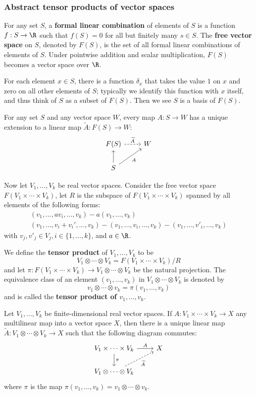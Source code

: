 \subsubsection{Abstract tensor products of vector spaces}
For any set $S$, a \textbf{formal linear combination} of elements of $S$ is a function $f:S\to\R$ such that $f(S)=0$ for all but finitely many $s\in S$. The \textbf{free vector space} on $S$, denoted by $F(S)$, is the set of all formal linear combinations of elements of $S$. Under pointwise addition and scalar multiplication, $F(S)$ becomes a vector space over $\R$.\par
For each element $x\in S$, there is a function $\delta_x$ that takes the value $1$
on $x$ and zero on all other elements of $S$; typically we identify this function with $x$ itself, and thus think of $S$ as a subset of $F(S)$. Then we see $S$ is a basis of $F(S)$.
\begin{proposition}
For any set $S$ and any vector space $W$, every map $A:S\to W$ has a unique extension to a linear map $\widetilde{A}:F(S)\to W$:
\[\begin{tikzcd}
F(S)\ar[r,dashed,"\widetilde{A}"]&W\\
S\ar[u]\ar[ru,swap,"A"]
\end{tikzcd}\]
\end{proposition}
Now let $V_1,\dots,V_k$ be real vector spaces. Consider the free vector space $F(V_1\times\cdots\times V_k)$, let $R$ is the subspace of $F(V_1\times\cdots\times V_k)$ spanned by all elements of the following forms:
\[\begin{array}{c}
(v_1,\dots,av_i,\dots,v_k)-a(v_1,\dots,v_k)\\
(v_1,\dots,v_i+v_i',\dots,v_k)-(v_1,\dots,v_i,\dots,v_k)-(v_1,\dots,v'_i,\dots,v_k)
\end{array}\]
with $v_j,v'_j\in V_j,i\in\{1,\dots,k\}$, and $a\in\R$.\par 
We define the \textbf{tensor product} of $V_1,\dots,V_k$ to be
\[V_1\otimes\cdots\otimes V_k=F(V_1\times\cdots\times V_k)/R\]
and let $\pi:F(V_1\times\cdots\times V_k)\to V_1\otimes\cdots\otimes V_k$ be the natural projection. The equivalence class of an element $(v_1,\dots,v_k)$ in $V_1\otimes\cdots\otimes V_k$ is denoted by
\[v_1\otimes\cdots\otimes v_k=\pi(v_1,\dots,v_k)\]
and is called the \textbf{tensor product of \boldmath$v_1,\dots,v_k$}.
\begin{proposition}
Let $V_1,\dots,V_k$ be finite-dimensional real vector spaces. If $A:V_1\times\cdots\times V_k\to X$ any multilinear map into a vector space $X$, then there is a unique linear map $\widetilde{A}:V_1\otimes\cdots\otimes V_k\to X$ such that the following diagram commutes:
\[\begin{tikzcd}
V_1\times\cdots\times V_k\ar[d,"\pi"]\ar[r,"A"]&X\\
V_1\otimes\cdots\otimes V_k\ar[ru,dashed,swap,"\widetilde{A}"]
\end{tikzcd}\]
where $\pi$ is the map $\pi(v_1,\dots,v_k)=v_1\otimes\cdots\otimes v_k$.
\end{proposition}
